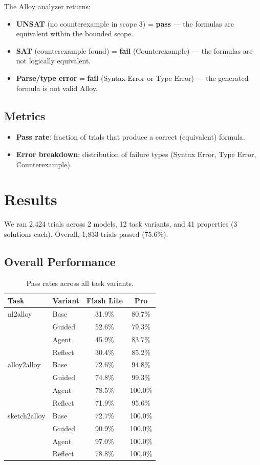 \documentclass[11pt]{article}
\begin{document}
The Alloy analyzer returns:
\begin{itemize}
  \item \textbf{UNSAT} (no counterexample in scope 3) = \textbf{pass} --- the formulas are equivalent within the bounded scope.
  \item \textbf{SAT} (counterexample found) = \textbf{fail} (Counterexample) --- the formulas are not logically equivalent.
  \item \textbf{Parse/type error} = \textbf{fail} (Syntax Error or Type Error) --- the generated formula is not valid Alloy.
\end{itemize}

\subsection{Metrics}

\begin{itemize}
  \item \textbf{Pass rate}: fraction of trials that produce a correct (equivalent) formula.
  \item \textbf{Error breakdown}: distribution of failure types (Syntax Error, Type Error, Counterexample).
\end{itemize}

\section{Results}

We ran 2,424 trials across 2 models, 12 task variants, and 41 properties (3 solutions each). Overall, 1,833 trials passed (75.6\%).

\subsection{Overall Performance}

\begin{table}[h]
\centering
\begin{tabular}{llcc}
\toprule
\textbf{Task} & \textbf{Variant} & \textbf{Flash Lite} & \textbf{Pro} \\
\midrule
nl2alloy & Base & 31.9\% & 80.7\% \\
 & Guided & 52.6\% & 79.3\% \\
 & Agent & 45.9\% & 83.7\% \\
 & Reflect & 30.4\% & 85.2\% \\
alloy2alloy & Base & 72.6\% & 94.8\% \\
 & Guided & 74.8\% & 99.3\% \\
 & Agent & 78.5\% & 100.0\% \\
 & Reflect & 71.9\% & 95.6\% \\
sketch2alloy & Base & 72.7\% & 100.0\% \\
 & Guided & 90.9\% & 100.0\% \\
 & Agent & 97.0\% & 100.0\% \\
 & Reflect & 78.8\% & 100.0\% \\
\bottomrule
\end{tabular}
\caption{Pass rates across all task variants.}
\end{table}
\end{document}
